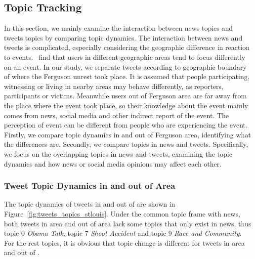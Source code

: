 \subsection{Topic Tracking}
\label{subsec:topic_track}

In this section, we mainly examine the interaction between news topics and tweets topics by comparing topic dynamics. The interaction between news and tweets is complicated, especially considering the geographic difference in reaction to events.~ find that users in different geographic areas tend to focus differently on an event. In our study, we separate tweets according to geographic boundary of \stlouis where the Ferguson unrest took place. It is assumed that people participating, witnessing or living in nearby areas may behave differently, as reporters, participants or victims. Meanwhile users out of Ferguson area are far away from the place where the event took place, so their knowledge about the event mainly comes from news, social media and other indirect report of the event. The perception of event can be different from people who are experiencing the event. Firstly, we compare topic dynamics in and out of Ferguson area, identifying what the differences are. Secondly, we compare topics in news and tweets. Specifically, we focus on the overlapping topics in news and tweets, examining the topic dynamics and how news or social media opinions may affect each other.

\subsubsection{Tweet Topic Dynamics in and out of \stlouis Area}

The topic dynamics of tweets in and out of \stlouis are shown in Figure~\ref{fig:tweets_topics_stlouis}. Under the common topic frame with news, both tweets in \stlouis area and out of \stlouis area lack some topics that only exist in news, thus topic 0 \emph{Obama Talk}, topic 7 \emph{Shoot Accident} and topic 9 \emph{Race and Community}. For the rest topics, it is obvious that topic change is different for tweets in \stlouis area and out of \stlouis.

